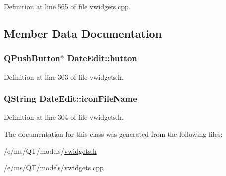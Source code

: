Definition at line 565 of file vwidgets.cpp.



\subsection{Member Data Documentation}
\hypertarget{classDateEdit_a54dc3b413c28dac9aa044d185b17bccf}{
\subsubsection[{button}]{\setlength{\rightskip}{0pt plus 5cm}QPushButton$\ast$ {\bf DateEdit::button}}}
\label{classDateEdit_a54dc3b413c28dac9aa044d185b17bccf}


Definition at line 303 of file vwidgets.h.

\hypertarget{classDateEdit_a79214d87b36dc55ec6f783fa287d238d}{
\subsubsection[{iconFileName}]{\setlength{\rightskip}{0pt plus 5cm}QString {\bf DateEdit::iconFileName}}}
\label{classDateEdit_a79214d87b36dc55ec6f783fa287d238d}


Definition at line 304 of file vwidgets.h.



The documentation for this class was generated from the following files:\begin{DoxyCompactItemize}
\item 
/e/ms/QT/models/\hyperlink{vwidgets_8h}{vwidgets.h}\item 
/e/ms/QT/models/\hyperlink{vwidgets_8cpp}{vwidgets.cpp}\end{DoxyCompactItemize}

